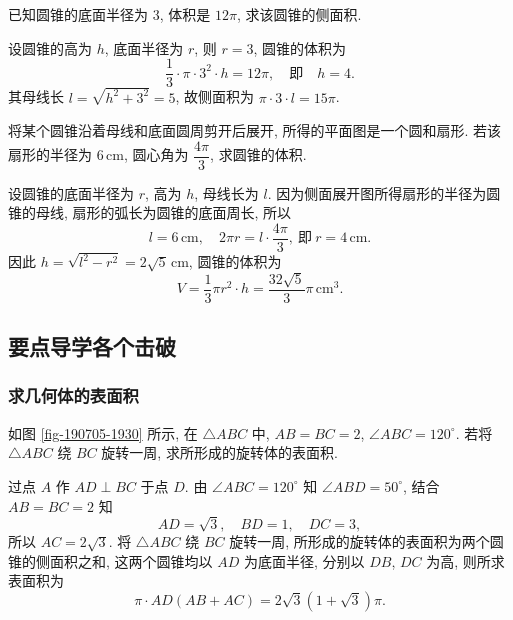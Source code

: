 \begin{exercise}
    已知圆锥的底面半径为 $3$, 体积是 $12\pi$, 求该圆锥的侧面积.
\end{exercise}
\beginsolution
    设圆锥的高为 $h$, 底面半径为 $r$, 则 $r=3$, 圆锥的体积为
    \[\frac13\cdot \pi\cdot 3^2\cdot h= 12\pi,\quad
        \text{即}\quad h=4.\]
    其母线长 $l=\sqrt{h^2+3^2}= 5$, 故侧面积为 $\pi\cdot 3\cdot l= 15\pi$.
\endsolution

\begin{exercise}
    将某个圆锥沿着母线和底面圆周剪开后展开, 所得的平面图是一个圆和扇形. 若该扇形的半径为 $6\,\text{cm}$, 圆心角为 $\dfrac{4\pi}3$, 求圆锥的体积.
\end{exercise}
\beginsolution
    设圆锥的底面半径为 $r$, 高为 $h$, 母线长为 $l$. 因为侧面展开图所得扇形的半径为圆锥的母线, 扇形的弧长为圆锥的底面周长, 所以
    \[l= 6\,\text{cm},\quad 2\pi r= l\cdot \frac{4\pi}3,
        \ \text{即}\ r= 4\,\text{cm}.\]
    因此 $h=\sqrt{l^2- r^2}= 2\sqrt5\,\text{cm}$, 圆锥的体积为\[V= \frac13\pi r^2\cdot h
        = \frac{32\sqrt5}3 \pi\,\text{cm}^3.\]
\endsolution

\subsection{要点导学\quad 各个击破}
\subsubsection{求几何体的表面积}
\begin{example}
    如图 \ref{fig-190705-1930} 所示, 在 $\triangle ABC$ 中, $AB=BC=2$, $\angle ABC=120^\circ$. 若将 $\triangle ABC$ 绕 $BC$ 旋转一周, 求所形成的旋转体的表面积.
\end{example}
\beginsolution
    过点 $A$ 作 $AD\perp BC$ 于点 $D$. 由 $\angle ABC= 120^\circ$ 知 $\angle ABD= 50^\circ$, 结合 $AB=BC=2$ 知 
    \[AD=\sqrt3,\quad BD=1,\quad DC= 3,\]
    所以 $AC=2\sqrt3$. 将 $\triangle ABC$ 绕 $BC$ 旋转一周, 所形成的旋转体的表面积为两个圆锥的侧面积之和, 这两个圆锥均以 $AD$ 为底面半径, 分别以 $DB$, $DC$ 为高, 则所求表面积为
    \[\pi\cdot AD(AB+AC)= 2\sqrt3(1+\sqrt3)\pi.\]
\endsolution

